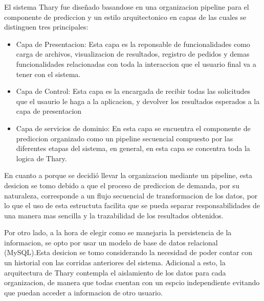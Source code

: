 El sistema Thary fue diseñado basandose en una organizacion pipeline para el componente de prediccion y un estilo arquitectonico en capas de las cuales se distinguen tres principales:

\begin{itemize}
    \item Capa de Presentacion: Esta capa es la reponsable de funcionalidades como carga de archivos, visualizacion de resultados, registro de pedidos y demas funcionalidades relacionadas con toda la interaccion que el usuario final va a tener con el sistema.
    \item Capa de Control: Esta capa es la encargada de recibir todas las solicitudes que el usaurio le haga a la aplicacion, y devolver los resultados esperados a la capa de presentacion
    \item Capa de servicios de dominio: En esta capa se encuentra el componente de prediccion organizado como un pipeline secuencial compuesto por las diferentes etapas del sistema, en general, en esta capa se concentra toda la logica de Thary.
\end{itemize}

En cuanto a porque se decidió llevar la organizacion mediante un pipeline, esta desicion se tomo debido a que el proceso de prediccion de demanda, por su naturaleza, corresponde a un flujo secuencial de transformacion de los datos, por lo que el uso de esta estructuta facilita que se pueda separar responsabilidades de una manera mas sencilla y la trazabilidad de los resultados obtenidos. 

Por otro lado, a la hora de elegir como se manejaria la persistencia de la informacion, se opto por usar un modelo de base de datos relacional (MySQL).Esta desicion se tomo considerando la necesidad de poder contar con un historial con las corridas anteriores del sistema. Adicional a esto, la arquitectura de Thary contempla el aislamiento de los datos para cada organizacion, de manera que todas cuentan con un espcio independiente evitando que puedan acceder a informacion de otro usuario. 

